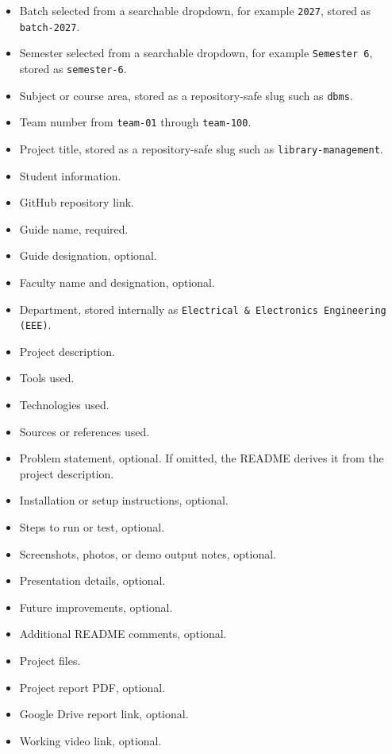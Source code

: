 \documentclass[12pt,a4paper]{article}
\begin{document}
\begin{itemize}[leftmargin=*]
    \item Batch selected from a searchable dropdown, for example \texttt{2027}, stored as \texttt{batch-2027}.
    \item Semester selected from a searchable dropdown, for example \texttt{Semester 6}, stored as \texttt{semester-6}.
    \item Subject or course area, stored as a repository-safe slug such as \texttt{dbms}.
    \item Team number from \texttt{team-01} through \texttt{team-100}.
    \item Project title, stored as a repository-safe slug such as \texttt{library-management}.
    \item Student information.
    \item GitHub repository link.
    \item Guide name, required.
    \item Guide designation, optional.
    \item Faculty name and designation, optional.
    \item Department, stored internally as \texttt{Electrical \& Electronics Engineering (EEE)}.
    \item Project description.
    \item Tools used.
    \item Technologies used.
    \item Sources or references used.
    \item Problem statement, optional. If omitted, the README derives it from the project description.
    \item Installation or setup instructions, optional.
    \item Steps to run or test, optional.
    \item Screenshots, photos, or demo output notes, optional.
    \item Presentation details, optional.
    \item Future improvements, optional.
    \item Additional README comments, optional.
    \item Project files.
    \item Project report PDF, optional.
    \item Google Drive report link, optional.
    \item Working video link, optional.
\end{itemize}
\end{document}
